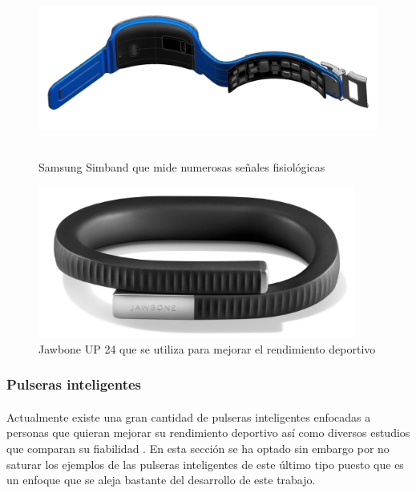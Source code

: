 \begin{figure}[]
   \begin{minipage}{0.48\textwidth}
     \centering
     \includegraphics[width=.7\linewidth, height=5cm]{Imagenes/w7}
    \caption{Samsung Simband que mide numerosas señales fisiológicas}
     \label{fig:w7}
   \end{minipage}\hfill
   \begin {minipage}{0.48\textwidth}
     \centering
     \includegraphics[width=.7\linewidth, height=5cm]{Imagenes/w8}
     \caption{Jawbone UP 24 que se utiliza para mejorar el rendimiento deportivo}
     \label{fig:w8}
   \end{minipage}
\end{figure}


\subsubsection{Pulseras inteligentes}
\label{subsubsec:pulserasInteligentes}
\paragraph{}
Actualmente existe una gran cantidad de pulseras inteligentes enfocadas a personas que quieran mejorar su rendimiento deportivo así como diversos estudios que comparan su fiabilidad \citep{sushames2016validity} \citep{baroni2015fitbit} \citep{kooiman2015reliability}. En esta sección se ha optado sin embargo por no saturar los ejemplos de las pulseras inteligentes de este último tipo puesto que es un enfoque que se aleja bastante del desarrollo de este trabajo.

